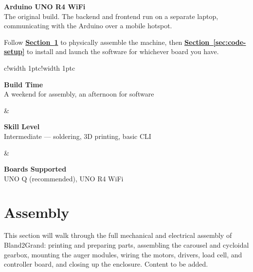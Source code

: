 \documentclass[11pt, letterpaper]{article}
\newcommand{\ticon}[1]{%
  \tikz[baseline=-0.55ex]{\node[circle, draw=white, line width=0.7pt, text=white,
    font=\bfseries\fontsize{6.5}{6.5}\selectfont, inner sep=0pt, minimum size=1.25em] {#1};}%
}
\newcommand{\secref}[1]{\hyperref[#1]{\textcolor{terracottadark}{\bfseries Section~\ref*{#1}}}}
\begin{document}
\vspace{0.5em}

\textbf{\textcolor{terracottadark}{Arduino UNO R4 WiFi}}\\
The original build. The backend and frontend run on a
separate laptop, communicating with the Arduino over a
mobile hotspot.

Follow \secref{sec:assembly} to physically assemble the machine, then \secref{sec:code-setup} to install and launch the software for whichever board you have.

\begin{tcolorbox}[notebox, title={\ticon{i}\ \ At a Glance}]


\noindent
\begin{tabular}{c!{\color{gold}\vrule width 1pt}c!{\color{gold}\vrule width 1pt}c}

\hspace*{-0.35cm}
\parbox{0.28\linewidth}{\centering
\textbf{\small\textcolor{terracottadark}{Build Time}}\\[6pt]
\footnotesize A weekend for assembly, an afternoon for software
}
&
\parbox{0.28\linewidth}{\centering
\textbf{\small\textcolor{terracottadark}{Skill Level}}\\[6pt]
\footnotesize Intermediate --- soldering, 3D printing, basic CLI
}
&
\hspace*{0.75cm}
\parbox{0.28\linewidth}{\centering
\textbf{\small\textcolor{terracottadark}{Boards Supported}}\\[6pt]
\footnotesize UNO Q (recommended), UNO R4 WiFi
}

\end{tabular}

\end{tcolorbox}

\section{Assembly}
\label{sec:assembly}

\begin{tcolorbox}[placeholderbox, title={Section In Progress}]
\small
This section will walk through the full mechanical and electrical assembly of Bland2Grand: printing and preparing parts, assembling the carousel and cycloidal gearbox, mounting the auger modules, wiring the motors, drivers, load cell, and controller board, and closing up the enclosure. Content to be added.
\end{tcolorbox}
\end{document}
